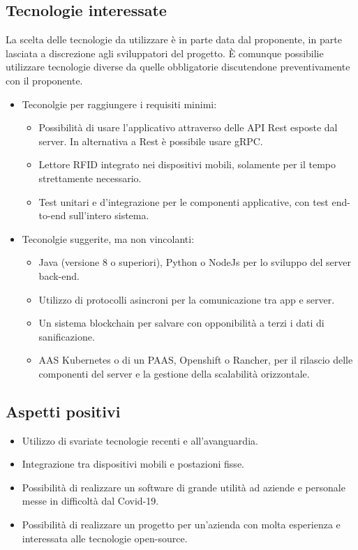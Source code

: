 \subsection{Tecnologie interessate}
La scelta delle tecnologie da utilizzare è in parte data dal proponente, in parte lasciata a discrezione agli sviluppatori del progetto.
È comunque possibilie utilizzare tecnologie diverse da quelle obbligatorie discutendone preventivamente con il proponente.
\begin{itemize}
    \item Teconolgie per raggiungere i requisiti minimi:
          \begin{itemize}
              \item Possibilità di usare l'applicativo attraverso delle API Rest esposte dal server. In alternativa a Rest è possibile usare gRPC.
              \item Lettore RFID integrato nei dispositivi mobili, solamente per il tempo strettamente necessario.
              \item Test unitari e d'integrazione per le componenti applicative, con test end-to-end sull'intero sistema.
          \end{itemize}
    \item Teconolgie suggerite, ma non vincolanti:
          \begin{itemize}
              \item Java (versione 8 o superiori), Python o NodeJs per lo sviluppo del server back-end.
              \item Utilizzo di protocolli asincroni per la comunicazione tra app e server.
              \item Un sistema blockchain per salvare con opponibilità a terzi i dati di sanificazione.
              \item AAS Kubernetes o di un PAAS, Openshift o Rancher, per il rilascio delle componenti del server e la gestione della scalabilità orizzontale.
          \end{itemize}
\end{itemize}

\subsection{Aspetti positivi}
\begin{itemize}
    \item Utilizzo di svariate tecnologie recenti e all'avanguardia.
    \item Integrazione tra dispositivi mobili e postazioni fisse.
    \item Possibilità di realizzare un software di grande utilità ad aziende e personale messe in difficoltà dal Covid-19.
    \item Possibilità di realizzare un progetto per un'azienda con molta esperienza e interessata alle tecnologie open-source.
\end{itemize}

